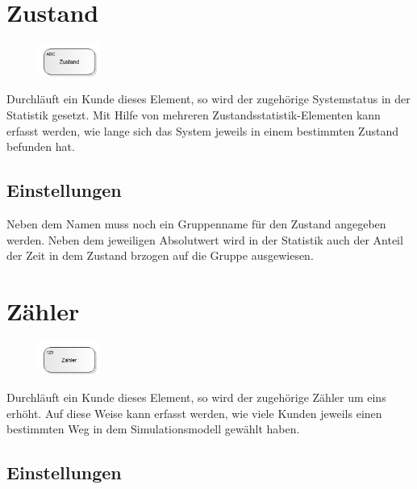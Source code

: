 \section{Zustand}
\label{ref:ModelElementStateStatistics}

\begin{figure}
\vspace{-22pt}
\includegraphics[width=2cm]{imageModelElementStateStatistics.png}
\vspace{-22pt}
\end{figure}

Durchläuft ein Kunde dieses Element, so wird der zugehörige Systemstatus in der Statistik gesetzt. 
Mit Hilfe von mehreren Zustandsstatistik-Elementen kann erfasst werden, wie lange sich das System
jeweils in einem bestimmten Zustand befunden hat.

\subsection*{Einstellungen}

Neben dem Namen muss noch ein Gruppenname für den Zustand angegeben werden. Neben dem jeweiligen
Absolutwert wird in der Statistik auch der Anteil der Zeit in dem Zustand brzogen auf die Gruppe ausgewiesen.


\section{Zähler}
\label{ref:ModelElementCounter}

\begin{figure}
\vspace{-22pt}
\includegraphics[width=2cm]{imageModelElementCounter.png}
\vspace{-22pt}
\end{figure}

Durchläuft ein Kunde dieses Element, so wird der zugehörige Zähler um eins erhöht. Auf diese Weise kann erfasst werden,
wie viele Kunden jeweils einen bestimmten Weg in dem Simulationsmodell gewählt haben.

\subsection*{Einstellungen}

